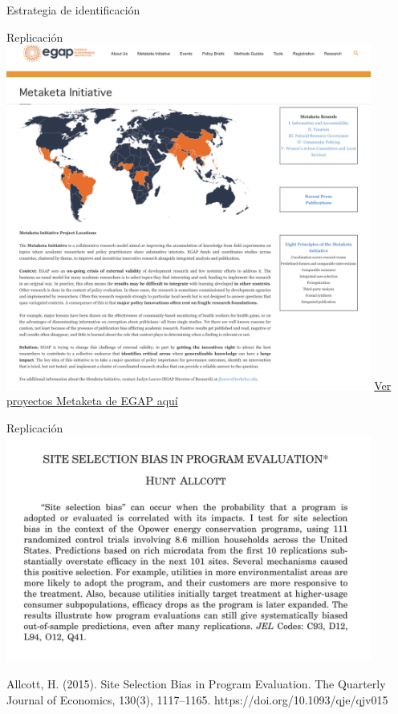 \documentclass[
  ignorenonframetext,
]{beamer}
\begin{document}
\begin{frame}{Estrategia de identificación}
\begin{frame}{Replicación}
\protect\hypertarget{replicaciuxf3n}{}
\includegraphics[width=0.9\textwidth,height=\textheight]{figs/metaketa.png}
\href{https://egap.org/metaketa}{Ver proyectos Metaketa de EGAP aquí}
\end{frame}

\begin{frame}{Replicación}
\protect\hypertarget{replicaciuxf3n-1}{}
\includegraphics[width=0.9\textwidth,height=\textheight]{figs/allcott_selectionbias.png}

\begin{tiny}
Allcott, H. (2015). Site Selection Bias in Program Evaluation. The Quarterly Journal of Economics, 130(3), 1117–1165. https://doi.org/10.1093/qje/qjv015
\end{tiny}
\end{frame}


\end{frame}
\end{document}

